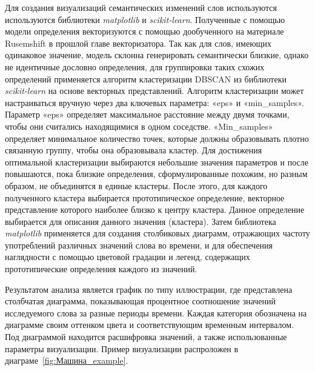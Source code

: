 \documentclass[LI,VKR]{HSEUniversity}
\begin{document}
Для создания визуализаций семантических изменений слов используются используются библиотеки
\textit{matplotlib} и \textit{scikit-learn}.
Полученные с помощью модели определения векторизуются с помощью дообученного
на материале Rusemshift в прошлой главе векторизатора.
Так как для слов, имеющих одинаковое значение,
модель склонна генерировать семантически близкие, однако не идентичные дословно определения,
для группировки таких схожих определений применяется алгоритм кластеризации DBSCAN из
библиотеки \textit{scikit-learn} на основе векторных представлений.
Алгоритм кластеризации может настраиваться вручную через два ключевых параметра:
«eps» и «min\_samples».
Параметр «eps» определяет максимальное расстояние между двумя точками,
чтобы они считались находящимися в одном соседстве.
«Min\_samples» определяет минимальное количество точек,
которые должны образовывать плотно связанную группу, чтобы она образовывала кластер.
Для достижения оптимальной кластеризации выбираются небольшие значения параметров и
после повышаются, пока близкие определения, сформулированные похожим, но разным образом,
не объединятся в единые кластеры.
После этого, для каждого полученного кластера выбирается прототипическое определение,
векторное представление которого наиболее близко к центру кластера.
Данное определение выбирается для описания данного значения (кластера).
Затем библиотека \textit{matplotlib} применяется для создания столбиковых диаграмм,
отражающих частоту употреблений различных значений слова во времени,
и для обеспечения наглядности с помощью цветовой градации и легенд,
содержащих прототипические определения каждого из значений.

Результатом анализа является график по типу иллюстрации, где представлена столбчатая диаграмма,
показывающая процентное соотношение значений исследуемого слова за разные периоды времени.
Каждая категория обозначена на диаграмме своим оттенком цвета и соответствующим временным интервалом.
Под диаграммой находится расшифровка значений, а также использованные параметры визуализации.
Пример визуализации распроложен в диаграме~\ref{fig:Машина_example}.
\end{document}

